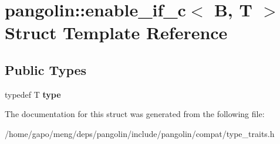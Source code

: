 \hypertarget{structpangolin_1_1enable__if__c}{}\section{pangolin\+:\+:enable\+\_\+if\+\_\+c$<$ B, T $>$ Struct Template Reference}
\label{structpangolin_1_1enable__if__c}
\subsection*{Public Types}
\begin{DoxyCompactItemize}
\item 
typedef T {\bfseries type}\hypertarget{structpangolin_1_1enable__if__c_a621047603a2f69e5a5abcbf783753a48}{}\label{structpangolin_1_1enable__if__c_a621047603a2f69e5a5abcbf783753a48}

\end{DoxyCompactItemize}


The documentation for this struct was generated from the following file\+:\begin{DoxyCompactItemize}
\item 
/home/gapo/meng/deps/pangolin/include/pangolin/compat/type\+\_\+traits.\+h\end{DoxyCompactItemize}
